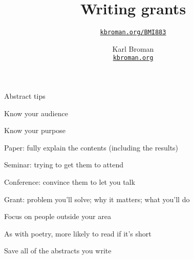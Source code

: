 \documentclass[aspectratio=169,12pt,t]{beamer}
\title{Writing grants}
\subtitle{}
\author{\href{https://kbroman.org/BMI883}{\tt kbroman.org/BMI883} }
\institute{}
\date{\small \hspace{3in} Karl Broman \\
  \hspace{3in} \href{https://kbroman.org}{\color{foreground}
    \small \tt kbroman.org}}
\begin{document}
{

\begin{frame}{Abstract tips}

  \bi
\item Know your audience
\item Know your purpose
  \bi
\item Paper: fully explain the contents (including the results)
\item Seminar: trying to get them to attend
\item Conference: convince them to let you talk
\item Grant: problem you'll solve; why it matters; what you'll do
   \ei
\item Focus on people outside your area
\item As with poetry, more likely to read if it's short
\item Save all of the abstracts you write
  \ei

\end{frame}
}
\end{document}
